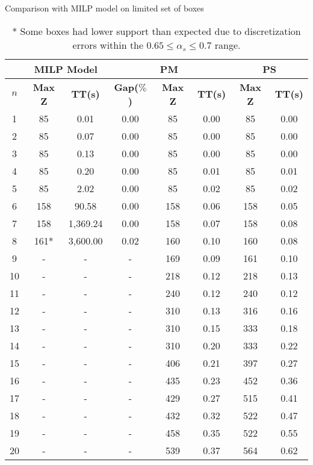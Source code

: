 \begin{table}[htbp]
    \centering
    \caption{Comparison with MILP model on limited set of boxes}
    \begin{tabular}{|c|c|c|c|c|c|c|c|}
    \hline
    & \multicolumn{ 2}{c|}{\textbf{MILP Model}} & \multicolumn{ 3}{c|}{\textbf{PM}} & \multicolumn{ 2}{c|}{\textbf{PS}} \\ \hline
    \textbf{$n$} & \textbf{Max Z} & \textbf{TT(s)} & \textbf{Gap($\%$)} & \textbf{Max Z} & \textbf{TT(s)} & \textbf{Max Z} & \textbf{TT(s)} \\ \hline
    1  & 85   & 0.01     & 0.00 & 85  & 0.00 & 85  & 0.00 \\ 
    2  & 85   & 0.07     & 0.00 & 85  & 0.00 & 85  & 0.00 \\ 
    3  & 85   & 0.13     & 0.00 & 85  & 0.00 & 85  & 0.00 \\ 
    4  & 85   & 0.20     & 0.00 & 85  & 0.01 & 85  & 0.01 \\ 
    5  & 85   & 2.02     & 0.00 & 85  & 0.02 & 85  & 0.02 \\ 
    6  & 158  & 90.58    & 0.00 & 158 & 0.06 & 158 & 0.05 \\ 
    7  & 158  & 1,369.24 & 0.00 & 158 & 0.07 & 158 & 0.08 \\ \hline
    8  & 161* & 3,600.00 & 0.02 & 160 & 0.10 & 160 & 0.08 \\ 
    9  & -    & -        & -    & 169 & 0.09 & 161 & 0.10 \\ 
    10 & -    & -        & -    & 218 & 0.12 & 218 & 0.13 \\ 
    11 & -    & -        & -    & 240 & 0.12 & 240 & 0.12 \\ 
    12 & -    & -        & -    & 310 & 0.13 & 316 & 0.16 \\ 
    13 & -    & -        & -    & 310 & 0.15 & 333 & 0.18 \\ 
    14 & -    & -        & -    & 310 & 0.20 & 333 & 0.22 \\ 
    15 & -    & -        & -    & 406 & 0.21 & 397 & 0.27 \\ 
    16 & -    & -        & -    & 435 & 0.23 & 452 & 0.36 \\ 
    17 & -    & -        & -    & 429 & 0.27 & 515 & 0.41 \\ 
    18 & -    & -        & -    & 432 & 0.32 & 522 & 0.47 \\ 
    19 & -    & -        & -    & 458 & 0.35 & 522 & 0.55 \\ 
    20 & -    & -        & -    & 539 & 0.37 & 564 & 0.62 \\ \hline
    \end{tabular}
    \label{exp:model}
    \caption*{* Some boxes had lower support than expected due to discretization errors within the $ 0.65 \le \alpha_s \le 0.7$ range.}
    \end{table}
